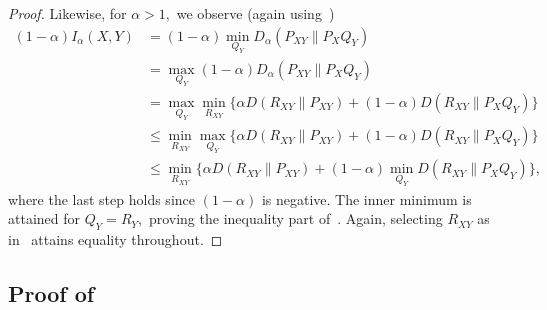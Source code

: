 \documentclass{article}
\numberwithin{theorem}{section}
\numberwithin{example}{section}
\numberwithin{remark}{section}
\numberwithin{definition}{section}
\newcommand{\E}{\mathbb{E}}
\begin{document}
\begin{proof}
Likewise, for $\alpha>1,$ we observe (again using~)
\begin{align}   
(1-\alpha)I_\alpha(X,Y) &= (1-\alpha) \min_{Q_Y} D_\alpha(P_{XY}\|P_XQ_Y) \\
&=  \max_{Q_Y}(1-\alpha) D_\alpha(P_{XY}\|P_XQ_Y) \\
&=  \max_{Q_Y} \min_{R_{XY}} \{\alpha D(R_{XY}\|P_{XY}) + (1-\alpha) D(R_{XY}\|P_XQ_Y) \} \\
&\le  \min_{R_{XY}} \max_{Q_Y} \{\alpha D(R_{XY}\|P_{XY}) + (1-\alpha) D(R_{XY}\|P_XQ_Y) \} \\
&\le  \min_{R_{XY}}  \{\alpha D(R_{XY}\|P_{XY}) + (1-\alpha) \min_{Q_Y} D(R_{XY}\|P_XQ_Y) \},
\end{align}
where the last step holds since $(1-\alpha)$ is negative.
The inner minimum is attained for $Q_Y=R_Y,$ proving the inequality part of~.
Again, selecting $R_{XY}$ as in~ attains equality throughout.
\end{proof}


\subsection{Proof of~}\label{app:variational:thm-Sibson-var-alternative}
\end{document}
